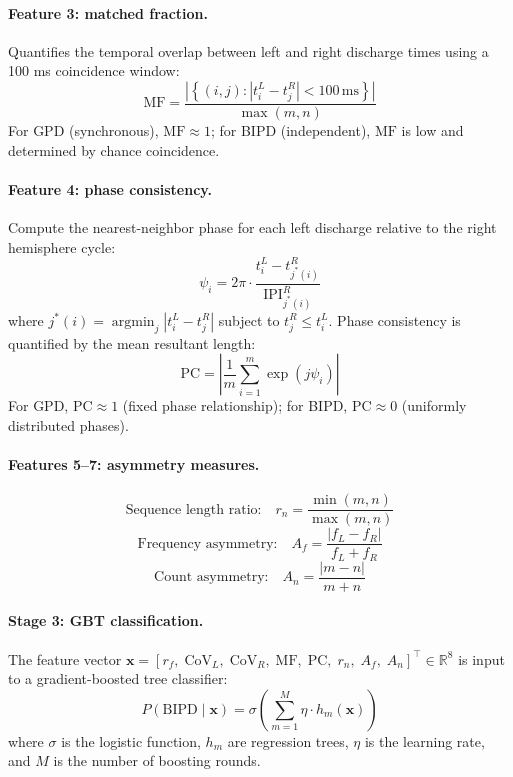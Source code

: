 \paragraph{Feature 3: matched fraction.}
Quantifies the temporal overlap between left and right discharge times using a 100 ms coincidence window:
\[ \mathrm{MF} = \frac{\left|\left\{(i,j) : |t_i^L - t_j^R| < 100\,\mathrm{ms}\right\}\right|}{\max(m, n)} \tag{8} \]
For GPD (synchronous), $\mathrm{MF} \approx 1$; for BIPD (independent), $\mathrm{MF}$ is low and determined by chance coincidence.

\paragraph{Feature 4: phase consistency.}
Compute the nearest-neighbor phase for each left discharge relative to the right hemisphere cycle:
\[ \psi_i = 2\pi \cdot \frac{t_i^L - t_{j^*(i)}^R}{\mathrm{IPI}_{j^*(i)}^R} \tag{9} \]
where $j^*(i) = \operatorname{argmin}_j |t_i^L - t_j^R|$ subject to $t_j^R \leq t_i^L$. Phase consistency is quantified by the mean resultant length:
\[ \mathrm{PC} = \left|\frac{1}{m} \sum_{i=1}^{m} \exp(j \psi_i)\right| \tag{10} \]
For GPD, $\mathrm{PC} \approx 1$ (fixed phase relationship); for BIPD, $\mathrm{PC} \approx 0$ (uniformly distributed phases).

\paragraph{Features 5--7: asymmetry measures.}
\[ \text{Sequence length ratio:} \quad r_n = \frac{\min(m,n)}{\max(m,n)} \tag{11} \]
\[ \text{Frequency asymmetry:} \quad A_f = \frac{|f_L - f_R|}{f_L + f_R} \tag{12} \]
\[ \text{Count asymmetry:} \quad A_n = \frac{|m - n|}{m + n} \tag{13} \]

\paragraph{Stage 3: GBT classification.}
The feature vector $\mathbf{x} = [r_f,\; \mathrm{CoV}_L,\; \mathrm{CoV}_R,\; \mathrm{MF},\; \mathrm{PC},\; r_n,\; A_f,\; A_n]^{\!\top} \in \mathbb{R}^8$ is input to a gradient-boosted tree classifier:
\[ P(\text{BIPD} \mid \mathbf{x}) = \sigma\!\left(\sum_{m=1}^{M} \eta \cdot h_m(\mathbf{x})\right) \tag{14} \]
where $\sigma$ is the logistic function, $h_m$ are regression trees, $\eta$ is the learning rate, and $M$ is the number of boosting rounds.

